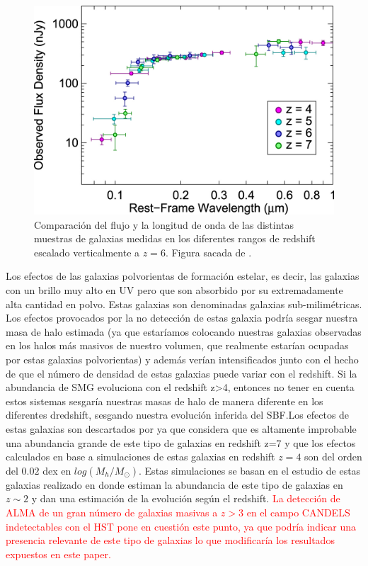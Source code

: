 \documentclass{article}
\begin{document}
\begin{figure}[t]
\begin{center}
\includegraphics[scale=1]{Figuras/sed_finkelstein}
\caption{\label{fig:sed_finkelstein} Comparación del flujo y la longitud de onda de las distintas muestras de galaxias medidas en los diferentes rangos de redshift escalado verticalmente a $z=6$. Figura sacada de \cite{finkelstein2015increasing}.}
\end{center}
\end{figure}

Los efectos de las galaxias polvorientas de formación estelar, es decir, las galaxias con un brillo muy alto en UV pero que son absorbido por su extremadamente alta cantidad en polvo. Estas galaxias son denominadas galaxias sub-milimétricas. Los efectos provocados por la no detección de estas galaxia podría sesgar nuestra masa de halo estimada (ya que estaríamos colocando nuestras galaxias observadas en los halos más masivos de nuestro volumen, que realmente estarían ocupadas por estas galaxias polvorientas) y además verían intensificados junto con el hecho de que el número de densidad de estas galaxias puede variar con el redshift. Si la abundancia de SMG evoluciona con el redshift z>4, entonces no tener en cuenta estos sistemas sesgaría nuestras masas de halo de manera diferente en los diferentes dredshift, sesgando nuestra evolución inferida del SBF.Los efectos de estas galaxias son descartados por \cite{finkelstein2015increasing}ya que considera que es altamente improbable una abundancia grande de este tipo de galaxias en redshift z=7 y que los efectos calculados en base a simulaciones de estas galaxias en redshift $z=4$ son del orden del $0.02$ dex en $log(M_h/M_\odot)$. Estas simulaciones se basan en el estudio de estas galaxias realizado en \cite{casey2014dusty} donde estiman la abundancia de este tipo de galaxias en $z\sim 2$ y dan una estimación de la evolución según el redshift. \textcolor{red}{La detección de ALMA de un gran número de galaxias masivas a $z>3$ en el campo CANDELS \citep{wang2019dominant} indetectables con el HST pone en cuestión este punto, ya que podría indicar una presencia relevante de este tipo de galaxias lo que modificaría los resultados expuestos en este paper.}\\
\end{document}
